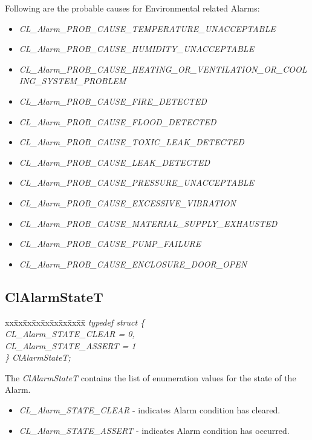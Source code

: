 \begin{flushleft}
\par
Following are the probable causes for Environmental related Alarms:
\begin{itemize}
\item \textit{CL\_\-Alarm\_\-PROB\_\-CAUSE\_\-TEMPERATURE\_\-UNACCEPTABLE}
\item \textit{CL\_\-Alarm\_\-PROB\_\-CAUSE\_\-HUMIDITY\_\-UNACCEPTABLE}
\item \textit{CL\_\-Alarm\_\-PROB\_\-CAUSE\_\-HEATING\_\-OR\_\-VENTILATION\_\-OR\_\-COOLING\_\-SYSTEM\_\-PROBLEM}
\item \textit{CL\_\-Alarm\_\-PROB\_\-CAUSE\_\-FIRE\_\-DETECTED}
\item \textit{CL\_\-Alarm\_\-PROB\_\-CAUSE\_\-FLOOD\_\-DETECTED}
\item \textit{CL\_\-Alarm\_\-PROB\_\-CAUSE\_\-TOXIC\_\-LEAK\_\-DETECTED}
\item \textit{CL\_\-Alarm\_\-PROB\_\-CAUSE\_\-LEAK\_\-DETECTED}
\item \textit{CL\_\-Alarm\_\-PROB\_\-CAUSE\_\-PRESSURE\_\-UNACCEPTABLE}
\item \textit{CL\_\-Alarm\_\-PROB\_\-CAUSE\_\-EXCESSIVE\_\-VIBRATION}
\item \textit{CL\_\-Alarm\_\-PROB\_\-CAUSE\_\-MATERIAL\_\-SUPPLY\_\-EXHAUSTED}
\item \textit{CL\_\-Alarm\_\-PROB\_\-CAUSE\_\-PUMP\_\-FAILURE}
\item \textit{CL\_\-Alarm\_\-PROB\_\-CAUSE\_\-ENCLOSURE\_\-DOOR\_\-OPEN}
\end{itemize}




\subsection{ClAlarmStateT}
\begin{tabbing}
xx\=xx\=xx\=xx\=xx\=xx\=xx\=xx\=xx\=\kill
\textit{typedef struct \{}\\
\>\>\>\>\textit{CL\_Alarm\_STATE\_CLEAR = 0,}\\
\>\>\>\>\textit{CL\_Alarm\_STATE\_ASSERT = 1}\\
\textit{\} ClAlarmStateT;}\end{tabbing}
The \textit{ClAlarmStateT} contains the list of enumeration values for the state of the Alarm.
\begin{itemize}
\item
\textit{CL\_\-Alarm\_\-STATE\_\-CLEAR} - indicates Alarm condition has cleared. 
\item
\textit{CL\_\-Alarm\_\-STATE\_\-ASSERT} - indicates Alarm condition has occurred.
\end{itemize}





\end{flushleft}
